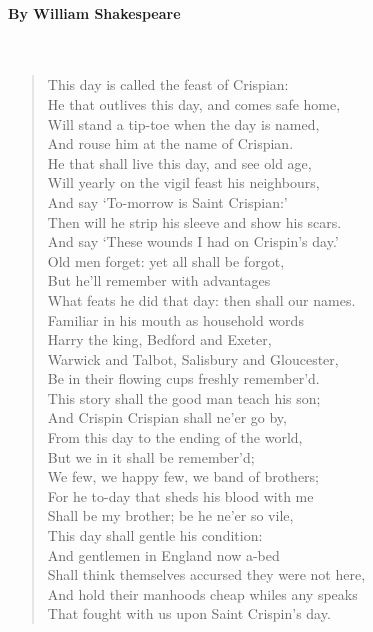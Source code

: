 \paragraph{By William Shakespeare}~
\begin{verse}
	This day is called the feast of Crispian:\\
	He that outlives this day, and comes safe home,\\
	Will stand a tip-toe when the day is named,\\
	And rouse him at the name of Crispian.\\
	He that shall live this day, and see old age,\\
	Will yearly on the vigil feast his neighbours,\\
	And say ‘To-morrow is Saint Crispian:’\\
	Then will he strip his sleeve and show his scars.\\
	And say ‘These wounds I had on Crispin’s day.’\\
	Old men forget: yet all shall be forgot,\\
	But he’ll remember with advantages\\
	What feats he did that day: then shall our names.\\
	Familiar in his mouth as household words\\
	Harry the king, Bedford and Exeter,\\
	Warwick and Talbot, Salisbury and Gloucester,\\
	Be in their flowing cups freshly remember’d.\\
	This story shall the good man teach his son;\\
	And Crispin Crispian shall ne’er go by,\\
	From this day to the ending of the world,\\
	But we in it shall be remember’d;\\
	We few, we happy few, we band of brothers;\\
	For he to-day that sheds his blood with me\\
	Shall be my brother; be he ne’er so vile,\\
	This day shall gentle his condition:\\
	And gentlemen in England now a-bed\\
	Shall think themselves accursed they were not here,\\
	And hold their manhoods cheap whiles any speaks\\
	That fought with us upon Saint Crispin’s day.
\end{verse}

